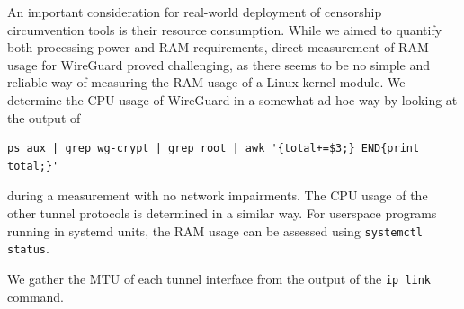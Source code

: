An important consideration for real-world deployment of censorship circumvention tools is their resource consumption.
While we aimed to quantify both processing power and RAM requirements, direct measurement of RAM usage for WireGuard proved challenging, as there seems to be no simple and reliable way of measuring the RAM usage of a Linux kernel module.
We determine the CPU usage of WireGuard in a somewhat ad hoc way by looking at the output of
\begin{verbatim}
ps aux | grep wg-crypt | grep root | awk '{total+=$3;} END{print total;}'
\end{verbatim}
during a measurement with no network impairments.
The CPU usage of the other tunnel protocols is determined in a similar way.
For userspace programs running in systemd units, the RAM usage can be assessed using \texttt{systemctl status}.

We gather the MTU of each tunnel interface from the output of the \texttt{ip link} command.

